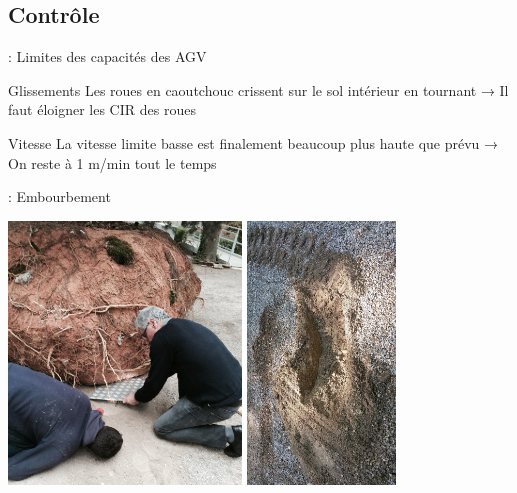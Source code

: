 \documentclass[12pt]{beamer}
\begin{document}
        \subsection{Contrôle}
            \begin{frame}{\subsecname: Limites des capacités des AGV}
                \begin{block}{Glissements}
                    Les roues en caoutchouc crissent sur le sol intérieur en tournant → Il faut éloigner les CIR des roues
                \end{block}
                \begin{block}{Vitesse}
                    La vitesse limite basse est finalement beaucoup plus haute que prévu → On reste à 1 m/min tout le temps
                \end{block}
            \end{frame}
            \begin{frame}{\subsecname: Embourbement}
                \begin{center}
                    \includegraphics[height=7cm]{img/embourbemenet.jpg}
                    \includegraphics[height=7cm]{img/embourbe.jpg}
                \end{center}
            \end{frame}
\end{document}
